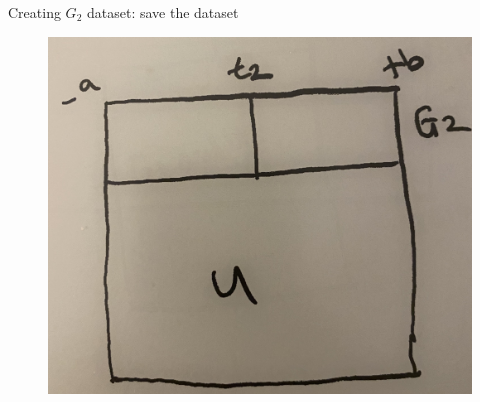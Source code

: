 \documentclass{beamer}
\begin{document}
\begin{frame}{Creating $G_2$ dataset: save the dataset}

	\begin{figure}
	\includegraphics[scale=0.085]{./lecture_includes/stacked5.jpg}
	\end{figure}

\end{frame}
\end{document}
